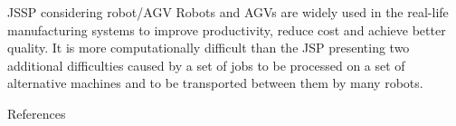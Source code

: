 \documentclass[8pt, xcolor=table]{beamer}
\begin{document}
\begin{frame}[fragile]{JSSP considering robot/AGV}
  Robots and AGVs are widely used in the real-life manufacturing
  systems to improve productivity, reduce cost and achieve better quality.
  It is more computationally difficult than the JSP presenting
  two additional difficulties caused by \alert{a set of jobs to be processed
  on a set of alternative machines and to be transported between
  them by many robots.}
\end{frame}


\begin{frame}[allowframebreaks]{References}
  
  
\end{frame}
\end{document}
